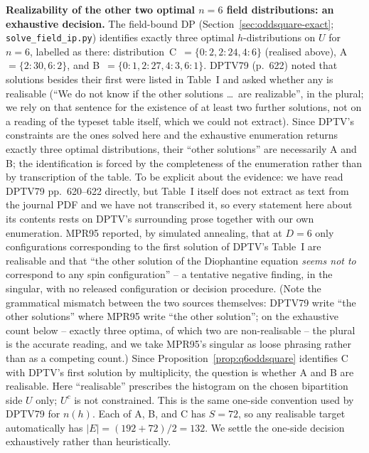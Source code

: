 \documentclass[12pt]{article}
\begin{document}
\noindent\textbf{Realizability of the other two optimal $n=6$ field
distributions: an exhaustive decision.} The field-bound DP
(Section~\ref{sec:oddsquare-exact}; \texttt{solve\_field\_ip.py}) identifies
exactly three optimal $h$-distributions on $U$ for $n=6$, labelled as there:
distribution~C~$=\{0{:}2,2{:}24,4{:}6\}$ (realised above),
A~$=\{2{:}30,6{:}2\}$, and B~$=\{0{:}1,2{:}27,4{:}3,6{:}1\}$.
DPTV79 (p.~622) noted that solutions besides their first were listed in
Table~I and asked whether any is realisable (``We do not know if the other
solutions \ldots\ are realizable'', in the plural; we rely on that sentence for
the existence of at least two further solutions, not on a reading of the
typeset table itself, which we could not extract). Since DPTV's constraints
are the ones solved here and the exhaustive enumeration returns exactly three
optimal distributions, their ``other solutions'' are necessarily A and B; the
identification is forced by the completeness of the enumeration rather than by
transcription of the table. To be explicit about the evidence: we have read DPTV79 pp.~620--622 directly, but Table~I itself does not extract as text from the journal PDF and we have not transcribed it, so every statement here about its contents rests on DPTV's surrounding prose together with our own enumeration. MPR95 reported, by simulated
annealing, that at $D=6$ only configurations corresponding to the first solution
of DPTV's Table~I are realisable and that ``the other solution of the Diophantine
equation \emph{seems not to} correspond to any spin configuration'' -- a
tentative negative finding, in the singular, with no released configuration or
decision procedure. (Note the grammatical mismatch between the two sources
themselves: DPTV79 write ``the other solutions'' where MPR95 write ``the
other solution''; on the exhaustive count below -- exactly three optima, of
which two are non-realisable -- the plural is the accurate reading, and we
take MPR95's singular as loose phrasing rather than as a competing count.)
Since Proposition~\ref{prop:q6oddsquare} identifies
C with DPTV's first solution by multiplicity, the question is whether A and B
are realisable. Here ``realisable'' prescribes the histogram on the chosen
bipartition side $U$ only; $U^c$ is not constrained. This is the same one-side
convention used by DPTV79 for $n(h)$. Each of A, B, and C has $S=72$, so any
realisable target automatically has $|E|=(192+72)/2=132$. We settle the
one-side decision exhaustively rather than heuristically.
\end{document}
